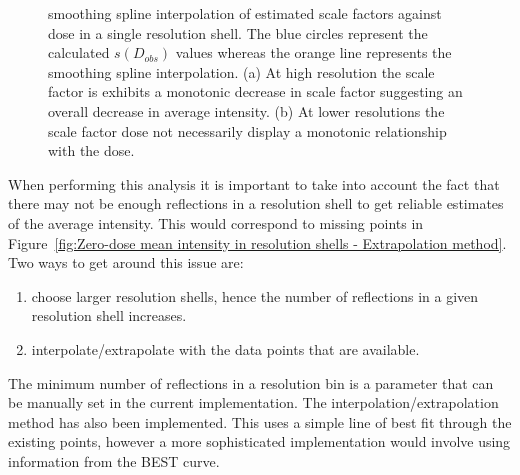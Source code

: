 \begin{figure}
\begin{subfigure}[b]{1\textwidth}
                \caption{}
                \label{fig:scale factor not monotonic - Extrapolation method}
        \end{subfigure}
        \caption{smoothing spline interpolation of estimated scale factors against dose in a single resolution shell.
        The blue circles represent the calculated $s(D_{obs})$ values whereas the orange line represents the smoothing spline interpolation.
        (a) At high resolution the scale factor is exhibits a monotonic decrease in scale factor suggesting an overall decrease in average intensity.
        (b) At lower resolutions the scale factor dose not necessarily display a monotonic relationship with the dose.}
        \label{fig:Scale factors, smoothing interpolation - Extrapolation method}
\end{figure}

When performing this analysis it is important to take into account the fact that there may not be enough reflections in a resolution shell to get reliable estimates of the average intensity.
This would correspond to missing points in Figure~\ref{fig:Zero-dose mean intensity in resolution shells - Extrapolation method}.
Two ways to get around this issue are:
\begin{enumerate}
    \item choose larger resolution shells, hence the number of reflections in a given resolution shell increases.
    \item interpolate/extrapolate with the data points that are available.
\end{enumerate}
The minimum number of reflections in a resolution bin is a parameter that can be manually set in the current implementation. The interpolation/extrapolation method has also been implemented.
This uses a simple line of best fit through the existing points, however a more sophisticated implementation would involve using information from the BEST curve.

